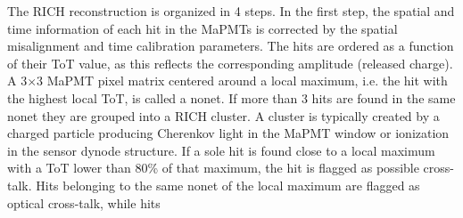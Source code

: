 \documentclass[5p,times,twocolumn]{elsarticle}
\begin{document}
The RICH reconstruction is organized in 4 steps.
In the first step, the spatial and time information of each hit in the MaPMTs is corrected by the spatial misalignment
and time calibration parameters. The hits are ordered as a function of their ToT value, as this reflects the
corresponding amplitude (released charge). A 3$\times$3 MaPMT pixel matrix centered around a local maximum, i.e.
the hit with the highest local ToT, is called a nonet. If more than 3 hits are found in the same nonet they are grouped
into a RICH cluster. A cluster is typically created by a charged particle producing Cherenkov light in the MaPMT
window or ionization in the sensor dynode structure. 
If a sole hit is found close to a local maximum with a ToT lower than 80\% of that maximum, the hit is flagged as
possible cross-talk. Hits belonging to the same nonet of the local maximum are flagged as optical cross-talk, while hits
\end{document}

